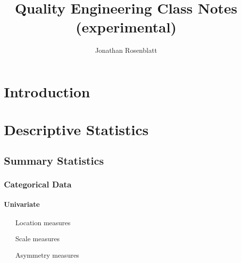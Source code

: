 \documentclass[12pt,a4paper]{report}
\author{Jonathan Rosenblatt}
\title{Quality Engineering Class Notes (experimental)}
\begin{document}
\maketitle

\tableofcontents








\chapter{Introduction}




\chapter{Descriptive Statistics}


\section{Summary Statistics}



\subsection{Categorical Data}

\subsubsection{Univariate}

\begin{enumerate}
\item[Location measures]

\item[Scale measures]

\item[Asymmetry measures]

\end{enumerate}
\end{document}
